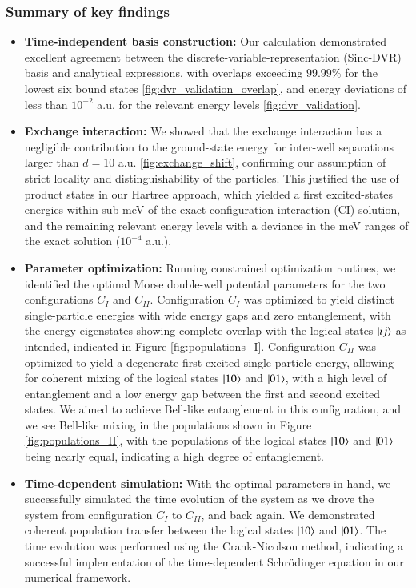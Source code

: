 \documentclass{subfiles}
\begin{document}
\subsubsection*{Summary of key findings}
\begin{itemize}
    \item \textbf{Time-independent basis construction:} Our calculation demonstrated excellent agreement between the discrete-variable-representation (Sinc-DVR) basis and analytical expressions, with overlaps exceeding $99.99\%$ for the lowest six bound states \ref{fig:dvr_validation_overlap}, and energy deviations of less than $10^{-2}$ a.u. for the relevant energy levels \ref{fig:dvr_validation}.
    \item \textbf{Exchange interaction:} We showed that the exchange interaction has a negligible contribution to the ground-state energy for inter-well separations larger than $d = 10$ a.u. \ref{fig:exchange_shift}, confirming our assumption of strict locality and distinguishability of the particles. This justified the use of product states in our Hartree approach, which yielded a first excited-states energies within sub-meV of the exact configuration-interaction (CI) solution, and the remaining relevant energy levels with a deviance in the meV ranges of the exact solution ($10^{-4}$ a.u.).
    \item \textbf{Parameter optimization:} Running constrained optimization routines, we identified the optimal Morse double-well potential parameters for the two configurations $C_I$ and $C_{II}$. Configuration $C_I$ was optimized to yield distinct single-particle energies with wide energy gaps and zero entanglement, with the energy eigenstates showing complete overlap with the logical states $\ket{ij}$ as intended, indicated in Figure \ref{fig:populations_I}. Configuration $C_{II}$ was optimized to yield a degenerate first excited single-particle energy, allowing for coherent mixing of the logical states $\ket{10}$ and $\ket{01}$, with a high level of entanglement and a low energy gap between the first and second excited states. We aimed to achieve Bell-like entanglement in this configuration, and we see Bell-like mixing in the populations shown in Figure \ref{fig:populations_II}, with the populations of the logical states $\ket{10}$ and $\ket{01}$ being nearly equal, indicating a high degree of entanglement.
    \item \textbf{Time-dependent simulation:} With the optimal parameters in hand, we successfully simulated the time evolution of the system as we drove the system from configuration $C_I$ to $C_{II}$, and back again. We demonstrated coherent population transfer between the logical states $\ket{10}$ and $\ket{01}$. The time evolution was performed using the Crank-Nicolson method, indicating a successful implementation of the time-dependent Schrödinger equation in our numerical framework. 

\end{itemize}
\end{document}

